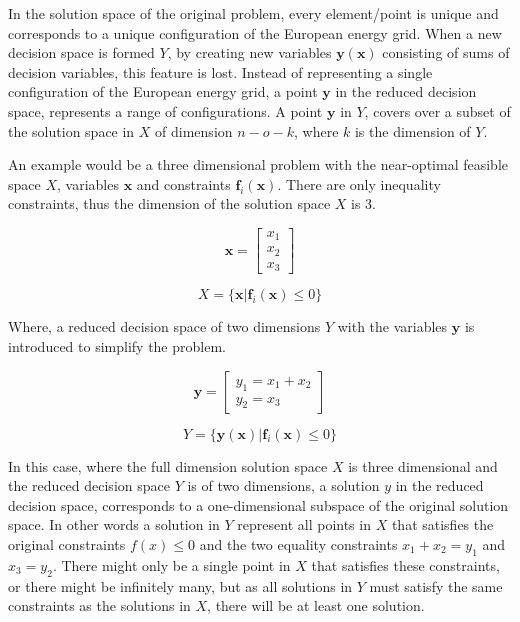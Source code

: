In the solution space of the original problem, every element/point is unique and corresponds to a unique configuration of the European energy grid. When a new decision space is formed $Y$, by creating new variables $\mathbf{y(x)}$ consisting of sums of decision variables, this feature is lost. Instead of representing a single configuration of the European energy grid, a point  $\mathbf{y}$ in the reduced decision space, represents a range of configurations. 
A point $\mathbf{y}$ in $Y$, covers over a subset of the solution space in $X$ of dimension $n-o-k$, where $k$ is the dimension of $Y$. 

An example would be a three dimensional problem with the near-optimal feasible space $X$, variables $\mathbf{x}$ and constraints $\mathbf{f}_i(\mathbf{x})$. There are only inequality constraints, thus the dimension of the solution space $X$ is 3. 

\begin{equation}    
\mathbf{x} = 
\begin{bmatrix}
x_{1} \\
x_{2} \\
x_{3}
\end{bmatrix}
\end{equation}

\begin{equation}    
X = \{ \mathbf{x} | \mathbf{f}_i(\mathbf{x}) \leq 0  \}
\end{equation}

Where, a reduced decision space of two dimensions $Y$ with the variables  $\mathbf{y}$ is introduced to simplify the problem.

\begin{equation}\label{eq:y_variables}    
\mathbf{y} = 
\begin{bmatrix}
y_1 = x_1 + x_2 \\
y_2= x_3 
\end{bmatrix}
\end{equation}

\begin{equation}    
Y = \{ \mathbf{y}(\mathbf{x}) | \mathbf{f}_i(\mathbf{x}) \leq 0  \}
\end{equation}

In this case, where the full dimension solution space $X$ is three dimensional and the reduced decision space $Y$ is of two dimensions, a solution $y$ in the reduced decision space, corresponds to a one-dimensional subspace of the original solution space. In other words a solution in $Y$ represent all points in $X$ that satisfies the original constraints $f(x)\leq0$ and the two equality constraints $ x_1 + x_2 = y_1$ and $x_3 = y_2 $. 
There might only be a single point in $X$ that satisfies these constraints, or there might be infinitely many, but as all solutions in $Y$ must satisfy the same constraints as the solutions in $X$, there will be at least one solution. 


